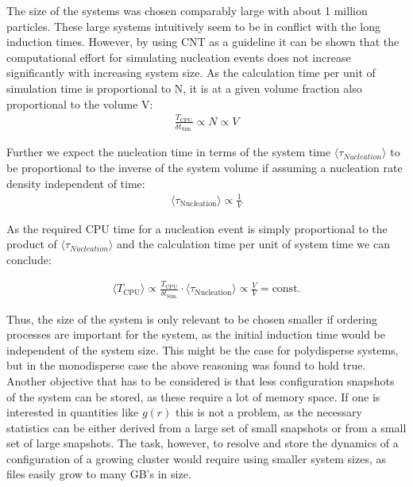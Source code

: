 The size of the systems was chosen comparably large with about 1 million particles. These large systems intuitively seem to be in conflict with the long induction times. However, by using CNT as a guideline it can be shown that the computational effort for simulating nucleation events does not increase significantly with increasing system size. As the calculation time per unit of simulation time is proportional to N, it is at a given volume fraction also proportional to the volume V:
\begin{align}
\label{eqn:system_size}
\frac{T_{\text{CPU}}}{\delta t_{\text{Sim.}}} \propto N \propto V 
\end{align}

Further we expect the nucleation time in terms of the system time $\langle \tau_{Nucleation} \rangle$ to be proportional to the inverse of the system volume if assuming a nucleation rate density independent of time:
\begin{align}
\langle \tau_{\text{Nucleation}} \rangle \propto \frac{1}{V}
\end{align}

As the required CPU time for a nucleation event is simply proportional to the product of $\langle \tau_{Nucleation} \rangle$ and the calculation time per unit of system time we can conclude:

\begin{align}
\langle T_{\text{CPU}} \rangle \propto  \frac{T_{\text{CPU}}}{\delta t_{\text{Sim.}}}  \cdot \langle \tau_{\text{Nucleation}} \rangle \propto \frac{V}{V} = \text{const.}
\end{align}

Thus, the size of the system is only relevant to be chosen smaller if ordering processes are important for the system, as the initial induction time would be independent of the system size. This might be the case for polydisperse systems, but in the monodisperse case the above reasoning was found to hold true.\\
Another objective that has to be considered is that less configuration snapshots of the system can be stored, as these require a lot of memory space. If one is interested in quantities like $g(r)$ this is not a problem, as the necessary statistics can be either derived from a large set of small snapshots or from a small set of large snapshots. The task, however, to resolve and store the dynamics of a configuration of a growing cluster would require using smaller system sizes, as files easily grow to many GB's in size. 

